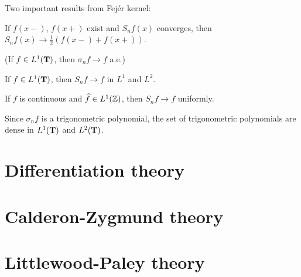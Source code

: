 \documentclass{../crs}
\begin{document}
Two important results from Fej\'er kernel:
\begin{cond}
\item If $f(x-)$, $f(x+)$ exist and $S_nf(x)$ converges, then $S_nf(x)\to\frac12(f(x-)+f(x+))$.
\item (If $f\in L^1(\mathbf{T})$, then $\sigma_nf\to f$ a.e.)

\item If $f\in L^1(\mathbf{T})$, then $S_nf\to f$ in $L^1$ and $L^2$.
\item If $f$ is continuous and $\widehat{f}\in L^1(\mathbb{Z})$, then $S_nf\to f$ uniformly.
\item Since $\sigma_nf$ is a trigonometric polynomial, the set of trigonometric polynomials are dense in $L^1(\mathbf{T})$ and $L^2(\mathbf{T})$.
\end{cond}





\chapter{Differentiation theory}






\chapter{Calderon-Zygmund theory}



\chapter{Littlewood-Paley theory}
\end{document}
